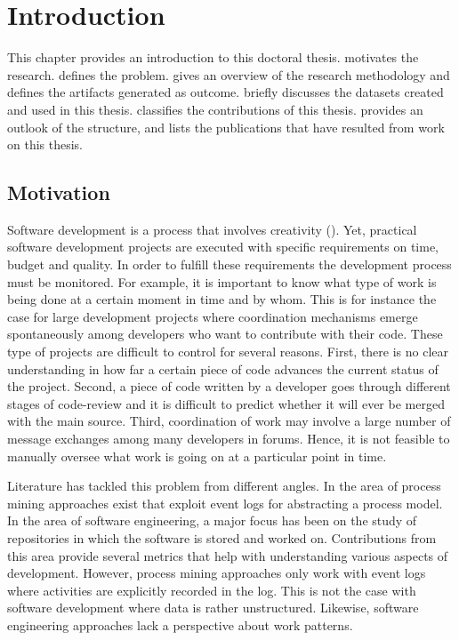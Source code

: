 \chapter{Introduction}
\label{chap:intro} %

This chapter provides an introduction to this doctoral thesis.  motivates the research.  defines the problem.  gives an overview of the research methodology and defines the artifacts generated as outcome.  briefly discusses the datasets created and used in this thesis.  classifies the contributions of this thesis.  provides an outlook of the structure, and  lists the publications that have resulted from work on this thesis. 

\section{Motivation}
\label{sec:intro-motivation}

Software development is a process that involves creativity (\citealp{DBLP:journals/jss/AldaveVGM19,DBLP:journals/jss/DingsoyrNBM12}). Yet, practical software development projects are executed with specific requirements on time, budget and quality. In order to fulfill these requirements the development process must be monitored. For example, it is important to know what type of work is being done at a certain moment in time and by whom. This is for instance the case for large development projects where coordination mechanisms emerge spontaneously among developers who want to contribute with their code.
These type of projects are difficult to control for several reasons. First, there is no clear understanding in how far a certain piece of code advances the current status of the project. Second, a piece of code written by a developer goes through different stages of code-review and it is difficult to predict whether it will ever be merged with the main source. Third, coordination of work may involve a large number of message exchanges among many developers in forums. Hence, it is not feasible to manually oversee what work is going on at a particular point in time. 

Literature has tackled this problem from different angles. In the area of process mining approaches exist that exploit event logs for abstracting a process model. In the area of software engineering, a major focus has been on the study of repositories in which the software is stored and worked on. Contributions from this area provide several metrics that help with understanding various aspects of development. However, process mining approaches only work with event logs where activities are explicitly recorded in the log. This is not the case with software development where data is rather unstructured. Likewise, software engineering approaches lack a perspective about work patterns. 


